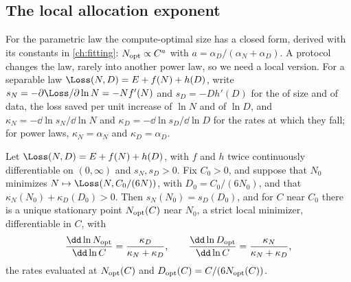 \begin{refsection}
\subsection*{The local allocation exponent}

For the parametric law the compute-optimal size has a closed form, derived with its constants in \cref{ch:fitting}: $N_{\mathrm{opt}}\propto C^{a}$ with $a=\alpha_D/(\alpha_N+\alpha_D)$. A protocol changes the law, rarely into another power law, so we need a local version. For a separable law $\Loss(N,D)=E+f(N)+h(D)$, write $s_N=-\partial\Loss/\partial\ln N=-Nf'(N)$ and $s_D=-Dh'(D)$ for the  of size and of data, the loss saved per unit increase of $\ln N$ and of $\ln D$, and $\kappa_N=-\dd\ln s_N/\dd\ln N$ and $\kappa_D=-\dd\ln s_D/\dd\ln D$ for the rates at which they fall; for power laws, $\kappa_N=\alpha_N$ and $\kappa_D=\alpha_D$.

\begin{lemma}\label{lem:protocol:allocation}
Let $\Loss(N,D)=E+f(N)+h(D)$, with $f$ and $h$ twice continuously differentiable on $(0,\infty)$ and $s_N,s_D>0$. Fix $C_0>0$, and suppose that $N_0$ minimizes $N\mapsto\Loss(N,C_0/(6N))$, with $D_0=C_0/(6N_0)$, and that $\kappa_N(N_0)+\kappa_D(D_0)>0$. Then $s_N(N_0)=s_D(D_0)$, and for $C$ near $C_0$ there is a unique stationary point $N_{\mathrm{opt}}(C)$ near $N_0$, a strict local minimizer, differentiable in $C$, with
\[
\frac{\dd\ln N_{\protocolopt}}{\dd\ln C}=\frac{\kappa_D}{\kappa_N+\kappa_D},\qquad\frac{\dd\ln D_{\protocolopt}}{\dd\ln C}=\frac{\kappa_N}{\kappa_N+\kappa_D},
\]
the rates evaluated at $N_{\mathrm{opt}}(C)$ and $D_{\mathrm{opt}}(C)=C/(6N_{\mathrm{opt}}(C))$.
\end{lemma}


\end{refsection}
